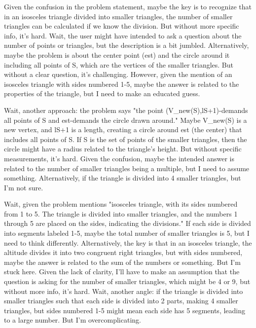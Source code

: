 Given the confusion in the problem statement, maybe the key is to recognize that in an isosceles triangle divided into smaller triangles, the number of smaller triangles can be calculated if we know the division. But without more specific info, it's hard. Wait, the user might have intended to ask a question about the number of points or triangles, but the description is a bit jumbled. Alternatively, maybe the problem is about the center point (est) and the circle around it including all points of S, which are the vertices of the smaller triangles. But without a clear question, it's challenging. However, given the mention of an isosceles triangle with sides numbered 1-5, maybe the answer is related to the properties of the triangle, but I need to make an educated guess.

Wait, another approach: the problem says "the point (V_new(S),lS+1)-demands all points of S and est-demands the circle drawn around." Maybe V_new(S) is a new vertex, and lS+1 is a length, creating a circle around est (the center) that includes all points of S. If S is the set of points of the smaller triangles, then the circle might have a radius related to the triangle's height. But without specific measurements, it's hard. Given the confusion, maybe the intended answer is related to the number of smaller triangles being a multiple, but I need to assume something. Alternatively, if the triangle is divided into 4 smaller triangles, but I'm not sure.

Wait, given the problem mentions "isosceles triangle, with its sides numbered from 1 to 5. The triangle is divided into smaller triangles, and the numbers 1 through 5 are placed on the sides, indicating the divisions." If each side is divided into segments labeled 1-5, maybe the total number of smaller triangles is 5, but I need to think differently. Alternatively, the key is that in an isosceles triangle, the altitude divides it into two congruent right triangles, but with sides numbered, maybe the answer is related to the sum of the numbers or something. But I'm stuck here. Given the lack of clarity, I'll have to make an assumption that the question is asking for the number of smaller triangles, which might be 4 or 9, but without more info, it's hard. Wait, another angle: if the triangle is divided into smaller triangles such that each side is divided into 2 parts, making 4 smaller triangles, but sides numbered 1-5 might mean each side has 5 segments, leading to a large number. But I'm overcomplicating.

